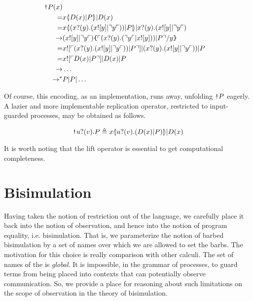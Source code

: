 \begin{eqnarray}
  \texttt{!} P(x) & & \nonumber\\
  =
  & x \langle\!| D(x) | P |\!\rangle | D(x) & \nonumber\\
  =
  & x \langle\!| (x ?( y ) . (x ![ y ] | \urcorner y \ulcorner)) | P |\!\rangle 
  | x ?( y ) . (x ![ y ] | \urcorner y \ulcorner) & \nonumber\\
  \rightarrow
  & (x ![ y ] | \urcorner y \ulcorner)\texttt{\{} \ulcorner (x ?( y ) . (\urcorner y \ulcorner | x ![ y ])) | P \urcorner / y \texttt{\}} & \nonumber\\
  =
  & x ![ \ulcorner (x ?( y ) . (x ![ y ] | \urcorner y \ulcorner)) | P \urcorner ]
  | {(x ?( y ) . (x ![ y ] | \urcorner y \ulcorner)) | P} & \nonumber\\
  =
  & x ![ \ulcorner D(x)| P \urcorner ]|{D(x)|P} & \nonumber\\
  \rightarrow
  & \ldots & \nonumber\\
  \rightarrow^*
  & P | P | \ldots & \nonumber
\end{eqnarray}

Of course, this encoding, as an implementation, runs away, unfolding
$\texttt{!} P$ eagerly. A lazier and more implementable replication
operator, restricted to input-guarded processes, may be obtained as follows.

\begin{eqnarray}
\texttt{!} u ?( v ) . P 
	\triangleq 
	x \langle\!| u ?( v ) . (D(x) | P) |\!\rangle | D(x) \nonumber
\end{eqnarray}

It is worth noting that the lift operator is essential to get
computational completeness. 

\section{Bisimulation}

Having taken the notion of restriction out of the language, we
carefully place it back into the notion of observation, and hence into
the notion of program equality, i.e. bisimulation. That is, we
parameterize the notion of barbed bisimulation by a set of names over
which we are allowed to set the barbs. The motivation for this choice
is really comparison with other calculi. The set of names of the
{\rhoc} is \textit{global}. It is impossible, in the grammar of
processes, to guard terms from being placed into contexts that can
potentially observe communication. So, we provide a place for
reasoning about such limitations on the scope of observation in the
theory of bisimulation.

